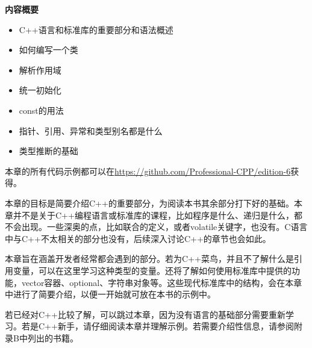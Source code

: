 
\noindent
\textbf{内容概要}

\begin{itemize}
\item
C++语言和标准库的重要部分和语法概述

\item
如何编写一个类

\item
解析作用域

\item
统一初始化

\item
const的用法

\item
指针、引用、异常和类型别名都是什么

\item
类型推断的基础
\end{itemize}

本章的所有代码示例都可以在\url{https://github.com/Professional-CPP/edition-6}获得。

本章的目标是简要介绍C++的重要部分，为阅读本书其余部分打下好的基础。本章并不是关于C++编程语言或标准库的课程，比如程序是什么、递归是什么，都不会出现。一些深奥的点，比如联合的定义，或者volatile关键字，也没有。C语言中与C++不太相关的部分也没有，后续深入讨论C++的章节也会如此。

本章旨在涵盖开发者经常都会遇到的部分。若为C++菜鸟，并且不了解什么是引用变量，可以在这里学习这种类型的变量。还将了解如何使用标准库中提供的功能，vector容器、optional、字符串对象等。这些现代标准库中的结构，会在本章中进行了简要介绍，以便一开始就可放在本书的示例中。

若已经对C++比较了解，可以跳过本章，因为没有语言的基础部分需要重新学习。若是C++新手，请仔细阅读本章并理解示例。若需要介绍性信息，请参阅附录B中列出的书籍。









